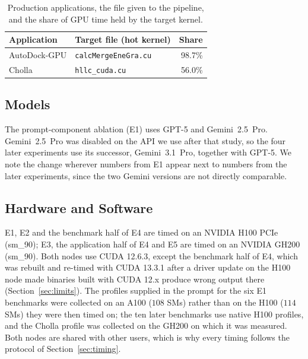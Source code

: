 \begin{table}[t]
\centering
\footnotesize
\caption{Production applications, the file given to the pipeline, and the share of GPU time held by
  the target kernel.}
\label{tab:apps}
\setlength{\tabcolsep}{3pt}
\begin{tabular}{@{}llr@{}}
\toprule
\textbf{Application} & \textbf{Target file (hot kernel)} & \textbf{Share} \\
\midrule
AutoDock-GPU & \texttt{calcMergeEneGra.cu} & 98.7\% \\
Cholla & \texttt{hllc\_cuda.cu} & 56.0\% \\
\bottomrule
\end{tabular}
\end{table}

\subsection{Models}
\label{sec:models}
The prompt-component ablation (E1) uses GPT-5 and Gemini~2.5~Pro. Gemini~2.5~Pro was disabled on the
API we use after that study, so the four later experiments use its successor, Gemini~3.1~Pro, together
with GPT-5. We note the change wherever numbers from E1 appear next to numbers from the later
experiments, since the two Gemini versions are not directly comparable.

\subsection{Hardware and Software}
\label{sec:hardware}
E1, E2 and the benchmark half of E4 are timed on an NVIDIA H100 PCIe (sm\_90); E3, the application
half of E4 and E5 are timed on an NVIDIA GH200 (sm\_90). Both nodes use CUDA 12.6.3, except the
benchmark half of E4, which was rebuilt and re-timed with CUDA 13.3.1 after a driver update on the H100
node made binaries built with CUDA 12.x produce wrong output there (Section~\ref{sec:limits}). The
profiles supplied in the prompt for the six E1 benchmarks were collected on an A100 ($108$ SMs) rather
than on the H100 ($114$ SMs) they were then timed on; the ten later benchmarks use native H100
profiles, and the Cholla profile was collected on the GH200 on which it was measured. Both nodes are
shared with other users, which is why every timing follows the protocol of Section~\ref{sec:timing}.

